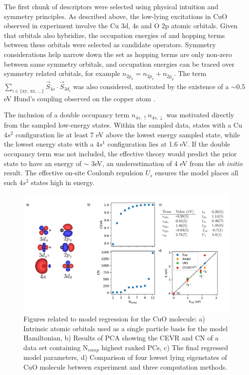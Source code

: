 \documentclass[12pt]{article}
\begin{document}
The first chunk of descriptors were selected using physical intuition and symmetry principles.
As described above, the low-lying excitations in CuO observed in experiment involve the Cu 3d, 4s and O 2p atomic orbitals.
Given that orbitals also hybridize, the occupation energies of and hopping terms between these orbitals were selected as candidate operators.
Symmetry considerations help narrow down the set as hopping terms are only non-zero between same symmetry orbitals, and occupation energies can be traced over symmetry related orbitals, for example $n_{2p_\pi} = n_{2p_x} + n_{2p_y}$.
The term $\sum_{i\in {\{\text{xy, xz, ...}}\}} \vec{S}_{4s} \cdot \vec{S}_{3d_i}$ was also considered, motivated by the existence of a $\sim $0.5 eV Hund's coupling observed on the copper atom \cite{Data2009}.

The inclusion of a double occupancy term $n_{4s,\uparrow} n_{4s,\downarrow}$ was motivated directly from the sampled low-energy states.
Within the sampled data, states with a Cu $4s^{2}$ configuration lie at least 7 eV above the lowest energy sampled state, while the lowest energy state with a $4s^{1}$ configuration lies at 1.6 eV.
If the double occupancy term was not included, the effective theory would predict the prior state to have an energy of $\sim $ 3eV, an underestimation of 4 eV from the \textit{ab initio} result.
The effective on-site Coulomb repulsion $U_s$ ensures the model places all such $4s^{2}$ states high in energy.

\begin{figure}
\centering
\includegraphics[width=1.0\linewidth]{./figs/cuo_regr_2.pdf}
\caption{Figures related to model regression for the CuO molecule: a) Intrinsic atomic orbitals used as a single particle basis for the model Hamiltonian, b) Results of PCA showing the CEVR and CN of a data set containing N$_{comp}$  highest ranked PCs, c) The final regressed model parameters, d) Comparison of four lowest lying eigenstates of CuO molecule between experiment and three computation methods.}
\label{fig:cuo_regr}
\end{figure}
\end{document}
